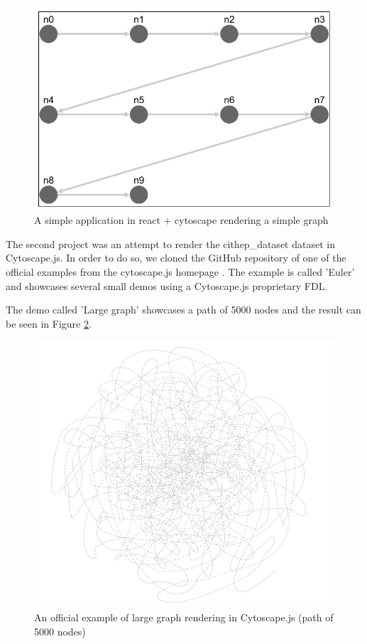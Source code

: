 \begin{figure}[p]\centering
  \includegraphics[width=140mm, keepaspectratio]{img/cytoscape_react_10_nodes_path.png}
  \caption{A simple application in react + cytoscape rendering a simple graph}
  \label{obr:cytoscape_react_test}
\end{figure}

The second project was an attempt to render the \gls{cithep_dataset} dataset in Cytoscape.js.
In order to do so, we cloned the GitHub repository of one of the official examples from the cytoscape.js homepage \cite{cytoscapes_js_github}.
The example is called 'Euler' and showcases several small demos using a Cytoscape.js proprietary \gls{FDL}.

The demo called 'Large graph' showcases a path of 5000 nodes and the result can be seen in Figure \ref{obr:cytoscape_5000_nodes_path}.

\begin{figure}[p]\centering
  \includegraphics[width=140mm, keepaspectratio]{img/cytoscape_5000_path_official_demo.png}
  \caption{An official example of large graph rendering in Cytoscape.js (path of 5000 nodes)}
  \label{obr:cytoscape_5000_nodes_path}
\end{figure}

